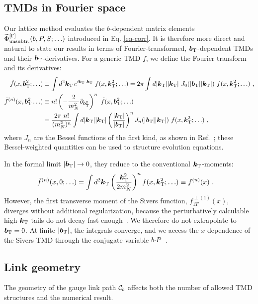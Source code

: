 \subsection{TMDs in Fourier space}
\label{sec:tmd_fourier}
Our lattice method evaluates the $b$-dependent matrix elements $\widetilde \Phi_{\text{unsubtr.}}^{[\Gamma]}(b,P,S;\ldots)$ introduced in Eq. \eqref{eq-corr}. It is therefore more direct and natural to state our results in terms of Fourier-transformed, $\boldsymbol{b}_{\mathrm T}$-dependent TMDs and their $\boldsymbol{b}_{\mathrm T}$-derivatives. For a generic TMD $f$, we define the Fourier transform and its derivatives:
\begin{align}
	\tilde f(x, \vprp{\bvec}^2;\ldots) & \equiv \int  d^2 \vprp{\kei} \, e^{i \vprp{\bvec} \cdot \vprp{\kei} }\; f(x, \vprp{\kei}^2;\ldots)
		= 2\pi \int      d|\vprp{\kei}| |\vprp{\kei}|\ J_0(|\vprp{\bvec}||\vprp{\kei}|)\  f(x, {\vprp{\kei}^2};\ldots )\ , \label{eq-FTMD} \\
	\tilde f^{(n)}(x, \vprp{\bvec}^2\ldots ) & \equiv n!\left( -\frac{2}{\mN^2}\partial_{\vprp{\bvec}^2} \right)^n \ 
	\tilde f(x, \vprp{\bvec}^2;\ldots ) \nonumber \\
		& = \frac{ 2\pi \ n!}{(\mN^2)^n} \int  d |\vprp{\kei}| |\vprp{\kei}|\left( \frac{|\vprp{\kei}|}{|\vprp{\bvec}|}\right)^n J_n(|\vprp{\bvec}||\vprp{\kei}|)\  f(x, {\vprp{\kei}^2};\ldots )\ , \label{eq-dFTMD}
\end{align}
where $J_n$ are the Bessel functions of the first kind, as shown in Ref.~\cite{Boer:2011xd}; these Bessel-weighted quantities can be used to structure evolution equations.

In the formal limit $|\boldsymbol{b}_{\mathrm T}| \rightarrow 0$, they reduce to the conventional $\boldsymbol{k}_{\mathrm T}$-moments:
\begin{align}
	\tilde f^{(n)}(x, 0;\ldots ) & = \int  d^2 \boldsymbol{k}_{\mathrm T} \left( \frac{\boldsymbol{k}_{\mathrm T}^2}{2 m_N^2 }\right)^n  f(x, \boldsymbol{k}_{\mathrm T}^2;\ldots ) \equiv  f^{(n)}(x)\ .
	\label{eq-btder2}
\end{align}
However, the first transverse moment of the Sivers function, $f_{1T}^{\perp(1)}(x)$, diverges without additional regularization, because the perturbatively calculable high-$\boldsymbol{k}_{\mathrm T}$ tails do not decay fast enough~\cite{Bacchetta:2008xw}. We therefore do not extrapolate to $\boldsymbol{b}_{\mathrm T}=0$. At finite $|\boldsymbol{b}_{\mathrm T}|$, the integrals converge, and we access the $x$-dependence of the Sivers TMD through the conjugate variable $b {\cdot} P$~\cite{Hagler:2009mb,Musch:2010ka}.

\subsection{Link geometry}
\label{sec:link_geometry}
The geometry of the gauge link path $\mathcal{C}_b$ affects both the number of allowed TMD structures and the numerical result. 

